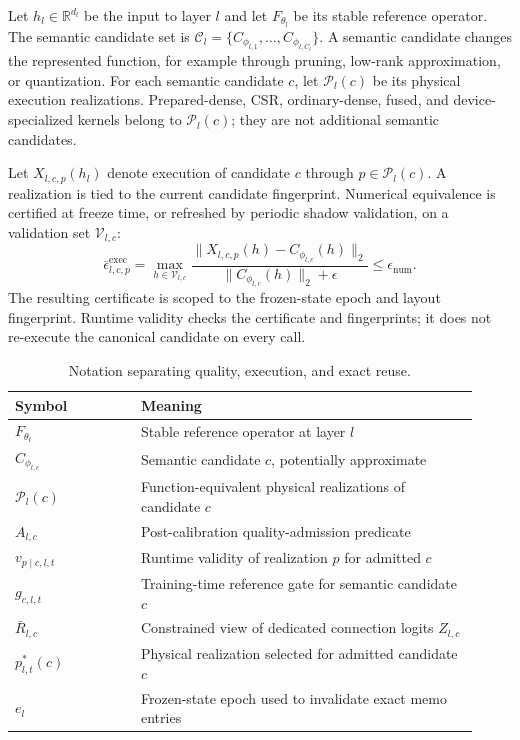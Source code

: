 \documentclass{article}
\begin{document}
Let $h_l\in\mathbb{R}^{d_l}$ be the input to layer $l$ and let
$F_{\theta_l}$ be its stable reference operator. The semantic candidate set is
$\mathcal{C}_l=\{C_{\phi_{l,1}},\ldots,C_{\phi_{l,C_l}}\}$. A semantic
candidate changes the represented function, for example through pruning,
low-rank approximation, or quantization. For each semantic candidate $c$, let
$\mathcal{P}_l(c)$ be its physical execution realizations. Prepared-dense, CSR,
ordinary-dense, fused, and device-specialized kernels belong to
$\mathcal{P}_l(c)$; they are not additional semantic candidates.

Let $X_{l,c,p}(h_l)$ denote execution of candidate $c$ through
$p\in\mathcal{P}_l(c)$. A realization is tied to the current candidate
fingerprint. Numerical equivalence is certified at freeze time, or refreshed
by periodic shadow validation, on a validation set $\mathcal{V}_{l,c}$:
\begin{equation}
\bar\epsilon^{\mathrm{exec}}_{l,c,p}
=
\max_{h\in\mathcal{V}_{l,c}}
\frac{\|X_{l,c,p}(h)-C_{\phi_{l,c}}(h)\|_2}
{\|C_{\phi_{l,c}}(h)\|_2+\epsilon}
\le \epsilon_{\mathrm{num}}.
\label{eq:achf-execution-equivalence}
\end{equation}
The resulting certificate is scoped to the frozen-state epoch and layout
fingerprint. Runtime validity checks the certificate and fingerprints; it does
not re-execute the canonical candidate on every call.

\begin{table}[h]
\centering
\caption{Notation separating quality, execution, and exact reuse.}
\label{tab:notation}
\small
\begin{tabular}{p{0.25\linewidth}p{0.67\linewidth}}
\toprule
Symbol & Meaning \\
\midrule
$F_{\theta_l}$ & Stable reference operator at layer $l$ \\
$C_{\phi_{l,c}}$ & Semantic candidate $c$, potentially approximate \\
$\mathcal{P}_l(c)$ & Function-equivalent physical realizations of candidate $c$ \\
$A_{l,c}$ & Post-calibration quality-admission predicate \\
$v_{p\mid c,l,t}$ & Runtime validity of realization $p$ for admitted $c$ \\
$g_{c,l,t}$ & Training-time reference gate for semantic candidate $c$ \\
$\bar R_{l,c}$ & Constrained view of dedicated connection logits $Z_{l,c}$ \\
$p^*_{l,t}(c)$ & Physical realization selected for admitted candidate $c$ \\
$e_l$ & Frozen-state epoch used to invalidate exact memo entries \\
\bottomrule
\end{tabular}
\end{table}
\end{document}
